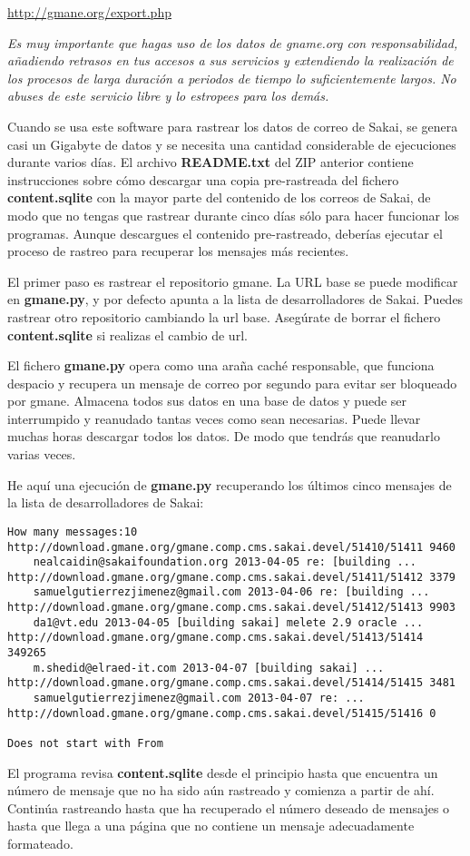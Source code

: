 \url{http://gmane.org/export.php}

{\em Es muy importante que hagas uso de los datos de gname.org con
responsabilidad, añadiendo retrasos en tus accesos a sus servicios y extendiendo
la realización de los procesos de larga duración a periodos de tiempo lo suficientemente largos.
No abuses de este servicio libre y lo estropees para los demás.}

Cuando se usa este software para rastrear los datos de correo de Sakai, se genera casi
un Gigabyte de datos y se necesita una cantidad considerable de ejecuciones durante varios días.
El archivo {\bf README.txt} del ZIP anterior contiene instrucciones sobre cómo
descargar una copia pre-rastreada del fichero {\bf content.sqlite} con
la mayor parte del contenido de los correos de Sakai, de modo que no tengas que rastrear
durante cinco días sólo para hacer funcionar los programas. Aunque descargues el contenido
pre-rastreado, deberías ejecutar el proceso de rastreo para recuperar los
mensajes más recientes.

El primer paso es rastrear el repositorio gmane. La URL base
se puede modificar en {\bf gmane.py}, y por defecto apunta a la lista
de desarrolladores de Sakai. Puedes rastrear otro repositorio cambiando la
url base. Asegúrate de borrar el fichero {\bf content.sqlite} si realizas
el cambio de url.

El fichero {\bf gmane.py} opera como una araña caché responsable, que
funciona despacio y recupera un mensaje de correo por segundo para
evitar ser bloqueado por gmane. Almacena todos sus datos
en una base de datos y puede ser interrumpido y reanudado tantas veces como
sean necesarias. Puede llevar muchas horas descargar todos los datos.
De modo que tendrás que reanudarlo varias veces.

He aquí una ejecución de {\bf gmane.py} recuperando los últimos cinco mensajes de
la lista de desarrolladores de Sakai:

\beforeverb
\begin{verbatim}
How many messages:10
http://download.gmane.org/gmane.comp.cms.sakai.devel/51410/51411 9460
    nealcaidin@sakaifoundation.org 2013-04-05 re: [building ...
http://download.gmane.org/gmane.comp.cms.sakai.devel/51411/51412 3379
    samuelgutierrezjimenez@gmail.com 2013-04-06 re: [building ...
http://download.gmane.org/gmane.comp.cms.sakai.devel/51412/51413 9903
    da1@vt.edu 2013-04-05 [building sakai] melete 2.9 oracle ...
http://download.gmane.org/gmane.comp.cms.sakai.devel/51413/51414 349265
    m.shedid@elraed-it.com 2013-04-07 [building sakai] ...
http://download.gmane.org/gmane.comp.cms.sakai.devel/51414/51415 3481
    samuelgutierrezjimenez@gmail.com 2013-04-07 re: ...
http://download.gmane.org/gmane.comp.cms.sakai.devel/51415/51416 0

Does not start with From 
\end{verbatim}
\afterverb
%
El programa revisa {\bf content.sqlite} desde el principio hasta que encuentra un número de mensaje que
no ha sido aún rastreado y comienza a partir de ahí. Continúa rastreando
hasta que ha recuperado el número deseado de mensajes o hasta que llega a una página
que no contiene un mensaje adecuadamente formateado.

